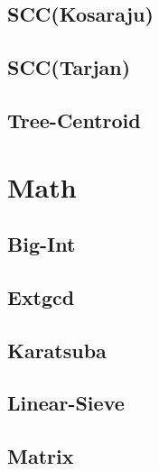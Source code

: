 \documentclass[a4paper,10pt,twocolumn,oneside]{article}
\begin{document}
\subsection{SCC(Kosaraju)}


\subsection{SCC(Tarjan)}


%

%

\subsection{Tree-Centroid}


\section{Math}
\subsection{Big-Int}


\subsection{Extgcd}


\subsection{Karatsuba}


\subsection{Linear-Sieve}


\subsection{Matrix}

\end{document}
